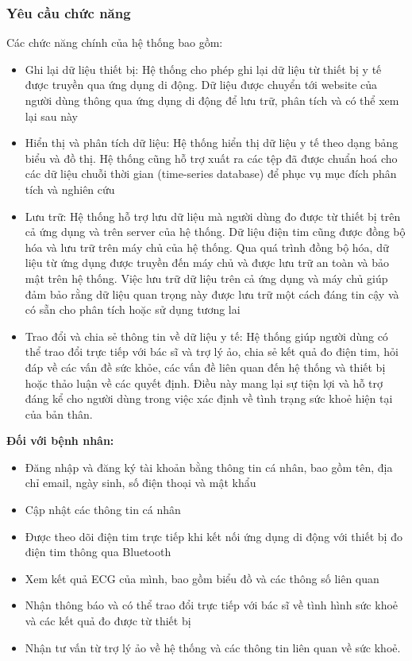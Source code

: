 \subsubsection{Yêu cầu chức năng}
Các chức năng chính của hệ thống bao gồm:
\begin{adjustwidth}{1.5em}{}
  \begin{itemize}
      \item Ghi lại dữ liệu thiết bị: Hệ thống cho phép ghi lại dữ liệu từ thiết bị y tế được truyền qua ứng dụng di động. Dữ liệu được chuyển tới website của người dùng thông qua ứng dụng di động để lưu trữ, phân tích và có thể xem lại sau này
      \item Hiển thị và phân tích dữ liệu: Hệ thống hiển thị dữ liệu y tế theo dạng bảng biểu và đồ thị. Hệ thống cũng hỗ trợ xuất ra các tệp đã được chuẩn hoá cho các dữ liệu chuỗi thời gian (time-series database) để phục vụ mục đích phân tích và nghiên cứu
      \item Lưu trữ: Hệ thống hỗ trợ lưu dữ liệu mà người dùng đo được từ thiết bị trên cả ứng dụng và trên server của hệ thống. Dữ liệu điện tim cũng được đồng bộ hóa và lưu trữ trên máy chủ của hệ thống. Qua quá trình đồng bộ hóa, dữ liệu từ ứng dụng được truyền đến máy chủ và được lưu trữ an toàn và bảo mật trên hệ thống. Việc lưu trữ dữ liệu trên cả ứng dụng và máy chủ giúp đảm bảo rằng dữ liệu quan trọng này được lưu trữ một cách đáng tin cậy và có sẵn cho phân tích hoặc sử dụng tương lai
      \item Trao đổi và chia sẻ thông tin về dữ liệu y tế: Hệ thống giúp người dùng có thể trao đổi trực tiếp với bác sĩ và trợ lý ảo, chia sẻ kết quả đo điện tim, hỏi đáp về các vấn đề sức khỏe, các vấn đề liên quan đến hệ thống và thiết bị hoặc thảo luận về các quyết định. Điều này mang lại sự tiện lợi và hỗ trợ đáng kể cho người dùng trong việc xác định về tình trạng sức khoẻ hiện tại của bản thân.
      

  \end{itemize}
\end{adjustwidth}
\textbf{Đối với bệnh nhân:}
\begin{adjustwidth}{1.5em}{}
\begin{itemize}
    \item Đăng nhập và đăng ký tài khoản bằng thông tin cá nhân, bao gồm tên, địa chỉ email, ngày sinh, số điện thoại và mật khẩu
    \item Cập nhật các thông tin cá nhân
    \item Được theo dõi điện tim trực tiếp khi kết nối ứng dụng di động với thiết bị đo điện tim thông qua Bluetooth
    \item Xem kết quả ECG của mình, bao gồm biểu đồ và các thông số liên quan
    \item Nhận thông báo và có thể trao đổi trực tiếp với bác sĩ về tình hình sức khoẻ và các kết quả đo được từ thiết bị
    \item Nhận tư vấn từ trợ lý ảo về hệ thống và các thông tin liên quan về sức khoẻ.
\end{itemize}
\end{adjustwidth}
